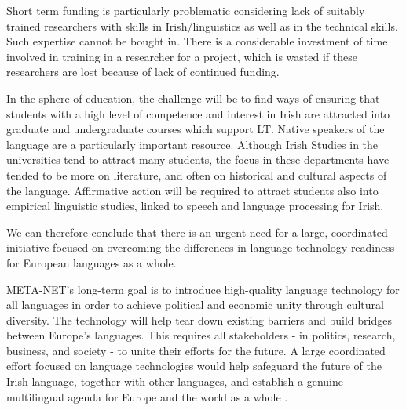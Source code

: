 \begin{multicols}{2}
Short term funding is particularly problematic considering lack of suitably trained researchers with skills in Irish/linguistics as well as in the technical skills. Such expertise cannot be bought in. There is a considerable investment of time involved in training in a researcher for a project, which is wasted if these researchers are lost because of lack of continued funding. 

In the sphere of education, the challenge will be to find ways of ensuring that students with a high level of competence and interest in Irish are attracted into graduate and undergraduate courses which support LT. Native speakers of the language are a particularly important resource. Although Irish Studies in the universities tend to attract many students, the focus in these departments have tended to be more on literature, and often on historical  and cultural aspects of the language. Affirmative action will be required to attract students also into empirical linguistic studies, linked to speech and language processing for Irish.






We can therefore conclude that there is an urgent need for a large, coordinated initiative focused on overcoming the differences in language technology readiness for European languages as a whole.

META-NET’s long-term goal is to introduce high-quality language technology for all languages in order to achieve political and economic unity through cultural diversity. The technology will help tear down existing barriers and build bridges between Europe’s languages. This requires all stakeholders - in politics, research, business, and society - to unite their efforts for the future. A large coordinated effort focused on language technologies would help safeguard the future of the Irish language, together with other languages, and establish a genuine multilingual agenda for Europe and the world as a whole \cite{tcstar}. 




\end{multicols}
